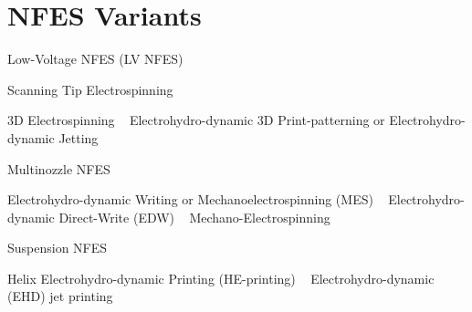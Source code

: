 \documentclass[3p,,preprint,12pt]{elsarticle}
\def\tblbottomrule{\noalign{\vspace*{6pt}}\hline\noalign{\vspace*{2pt}}}
\begin{document}
\begin{landscape}
\endgroup
\makeatletter{}\makeatother 
\end{landscape}

    
\section{NFES Variants}
Low-Voltage NFES (LV NFES) \unskip~\cite{527120:11973130}

Scanning Tip Electrospinning \unskip~\cite{527120:11974306}

3D Electrospinning \unskip~\cite{527120:11974313} \mbox{}\protect\newline Electrohydro-dynamic 3D Print-patterning or Electrohydro-dynamic Jetting \unskip~\cite{527120:11974310}

Multinozzle NFES \unskip~\cite{527120:11974322,527120:11974323,527120:11974324}

Electrohydro-dynamic Writing or Mechanoelectrospinning (MES) \unskip~\cite{527120:11974311} \mbox{}\protect\newline Electrohydro-dynamic Direct-Write (EDW) \unskip~\cite{527120:11974328} \mbox{}\protect\newline Mechano-Electrospinning \unskip~\cite{527120:11974304}

Suspension NFES \unskip~\cite{527120:12033656}

Helix Electrohydro-dynamic Printing (HE-printing) \unskip~\cite{527120:11974308} \mbox{}\protect\newline Electrohydro-dynamic (EHD) jet printing \unskip~\cite{527120:11974320}
\end{document}
